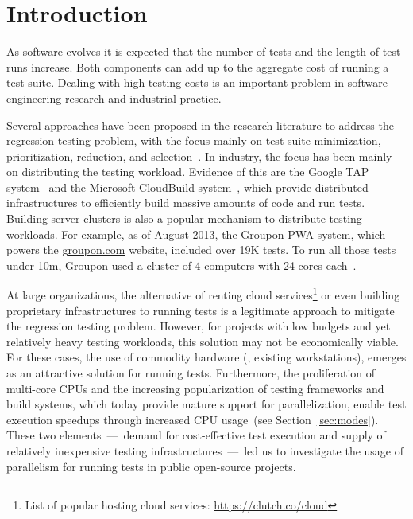 \section{Introduction}
\label{sec:intro}


As software evolves it is expected that the number of tests and the
length of test runs increase.  Both components can add up to the
aggregate cost of running a test suite.  Dealing with high testing
costs is an important problem in software engineering research and
industrial practice.

Several approaches have been proposed in the research literature to
address the regression testing problem, with the focus mainly on test
suite minimization, prioritization, reduction, and
selection~\cite{yoo-harman-stvr2012}.  In industry, the focus has been
mainly on distributing the testing workload.  Evidence of this are the
Google TAP system~\cite{google-tap,google-ci} and the Microsoft
CloudBuild system~\cite{prasad-shulte-ieee-microsoft-ci}, which
provide distributed infrastructures to efficiently build massive
amounts of code and run tests.  Building server clusters is also a
popular mechanism to distribute testing workloads.  For example, as of
August 2013, the Groupon PWA system, which powers the
\url{groupon.com} website, included over 19K tests.  To run all those
tests under 10m, Groupon used a cluster of 4 computers with 24 cores
each~\cite{kim-etal-fse2013}.

At large organizations, the alternative of renting cloud
services\footnote{List of popular hosting cloud services:
  \url{https://clutch.co/cloud}} or even building proprietary
infrastructures to running tests is a legitimate approach to mitigate
the regression testing problem.  However, for projects with low
budgets and yet relatively heavy testing workloads, this solution may
not be economically viable.  For these cases, the use of commodity
hardware (\eg{}, existing workstations), emerges as an attractive
solution for running tests.  Furthermore, the proliferation of
multi-core CPUs and the increasing popularization of testing
frameworks and build systems, which today provide mature support for
parallelization, enable test execution speedups through increased CPU
usage~(see Section~\ref{sec:modes}).  These two elements~---~demand
for cost-effective test execution and supply of relatively inexpensive
testing infrastructures~---~led us to investigate the usage of
parallelism for running tests in public open-source projects.

